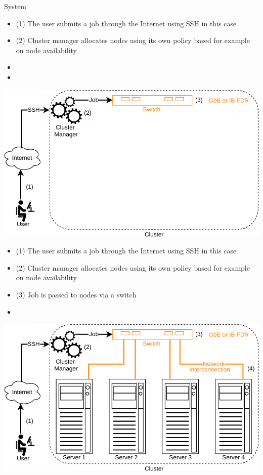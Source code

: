 \documentclass{beamer}
\begin{document}
\begin{frame}{System}
\begin{center}
\end{center}
    \begin{itemize}
    \item (1) The user submits a job through the Internet using SSH in this case
    \item (2) Cluster manager allocates nodes using its own policy based for example on node availability
    \item[~] 
    \item[~]
    \end{itemize}
    \framebreak
\begin{center}
    \includegraphics[scale=0.65]{SLIDES/img/System3.pdf}
\end{center}    
    \begin{itemize}
    \item (1) The user submits a job through the Internet using SSH in this case
    \item (2) Cluster manager allocates nodes using its own policy based for example on node availability
    \item (3) Job is passed to nodes via a switch
    \item[~]
    \end{itemize}
    \framebreak
\begin{center}
    \includegraphics[scale=0.65]{SLIDES/img/System4.pdf}

\end{center}
\end{frame}
\end{document}

